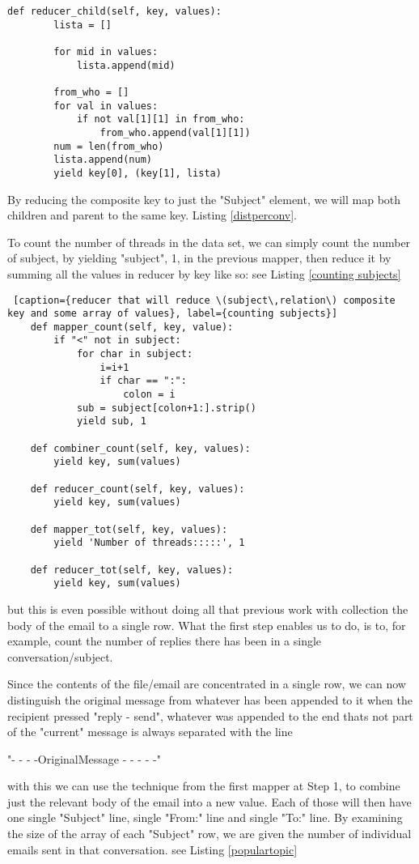 \documentclass{llncs}
\begin{document}
\begin{lstlisting}[caption={reducer that will reduce \(subject\,relation\) composite key and some array of values}, label={distperconv}]
	def reducer_child(self, key, values):
		lista = []

		for mid in values:
			lista.append(mid)

		from_who = []
		for val in values:
			if not val[1][1] in from_who:
				from_who.append(val[1][1])
		num = len(from_who)
		lista.append(num)
		yield key[0], (key[1], lista)
\end{lstlisting}
By reducing the composite key to just the "Subject" element, we will map both children and parent to the same key. Listing \ref{distperconv}.

To count the number of threads in the data set, we can simply count the number of subject, by yielding "subject", 1, in the previous mapper, then reduce it by summing all the values in reducer by key like so: see Listing \ref{counting subjects}

\begin{lstlisting} [caption={reducer that will reduce \(subject\,relation\) composite key and some array of values}, label={counting subjects}]
	def mapper_count(self, key, value):
		if "<" not in subject:
			for char in subject:
				i=i+1
				if char == ":":
					colon = i
			sub = subject[colon+1:].strip()
			yield sub, 1

	def combiner_count(self, key, values):
		yield key, sum(values)

	def reducer_count(self, key, values):
		yield key, sum(values)

	def mapper_tot(self, key, values):
		yield 'Number of threads:::::', 1

	def reducer_tot(self, key, values):
		yield key, sum(values)
\end{lstlisting}

but this is even possible without doing all that previous work with collection the body of the email to a single row. What the first step enables us to do, is to, for example, count the number of replies there has been in a single conversation/subject.


Since the contents of the file/email are concentrated in a single row, we can now distinguish the original message from whatever has been appended to it when the recipient pressed "reply - send", whatever was appended to the end thats not part of the "current" message is always separated with the line
\centerline{"- - - -OriginalMessage - - - - -"}
with this we can use the technique from the first mapper at Step 1, to combine just the relevant body of the email into a new value. Each of those will then have one single "Subject" line, single "From:" line and single "To:" line. By examining the size of the array of each "Subject" row, we are given the number of individual emails sent in that conversation. see Listing \ref{populartopic}
\end{document}
